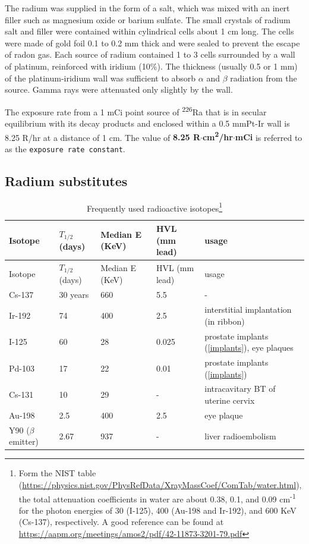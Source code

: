 \documentclass[]{book}
\let\rmarkdownfootnote\footnote%
\def\footnote{\protect\rmarkdownfootnote}
\theoremstyle{definition}
\theoremstyle{definition}
\theoremstyle{definition}
\theoremstyle{remark}
\begin{document}
The radium was supplied in the form of a salt, which was mixed with an
inert filler such as magnesium oxide or barium sulfate. The small
crystals of radium salt and filler were contained within cylindrical
cells about 1 cm long. The cells were made of gold foil 0.1 to 0.2 mm
thick and were sealed to prevent the escape of radon gas. Each source of
radium contained 1 to 3 cells surrounded by a wall of platinum,
reinforced with iridium (10\%). The thickness (usually 0.5 or 1 mm) of
the platinum-iridium wall was sufficient to absorb \(\alpha\) and
\(\beta\) radiation from the source. Gamma rays were attenuated only
slightly by the wall.

The exposure rate from a 1 mCi point source of \textsuperscript{226}Ra
that is in secular equilibrium with its decay products and enclosed
within a 0.5 mmPt-Ir wall is 8.25 R/hr at a distance of 1 cm. The value
of \textbf{8.25 R\(\cdot\)cm\textsuperscript{2}/hr\(\cdot\)mCi} is
referred to as the \texttt{exposure\ rate\ constant}.

\subsection{Radium substitutes}\label{radium-substitutes}

\begin{longtable}[]{@{}lllll@{}}
\caption{\label{tab:isotopes} Frequently used radioactive isotopes\footnote{Form
  the NIST table
  (\url{https://physics.nist.gov/PhysRefData/XrayMassCoef/ComTab/water.html}),
  the total attenuation coefficients in water are about 0.38, 0.1, and
  0.09 cm\textsuperscript{-1} for the photon energies of 30 (I-125), 400
  (Au-198 and Ir-192), and 600 KeV (Cs-137), respectively. A good
  reference can be found at
  \url{https://aapm.org/meetings/amos2/pdf/42-11873-3201-79.pdf}}}\tabularnewline
\toprule
Isotope & \(T_{1/2}\) (days) & Median E (KeV) & HVL (mm lead) &
usage\tabularnewline
\midrule
\endfirsthead
\toprule
Isotope & \(T_{1/2}\) (days) & Median E (KeV) & HVL (mm lead) &
usage\tabularnewline
\midrule
\endhead
Cs-137 & 30 years & 660 & 5.5 & -\tabularnewline
Ir-192 & 74 & 400 & 2.5 & interstitial implantation (in
ribbon)\tabularnewline
I-125 & 60 & 28 & 0.025 & prostate implants (\ref{implants}), eye
plaques\tabularnewline
Pd-103 & 17 & 22 & 0.01 & prostate implants
(\ref{implants})\tabularnewline
Cs-131 & 10 & 29 & - & intracavitary BT of uterine cervix\tabularnewline
Au-198 & 2.5 & 400 & 2.5 & eye plaque\tabularnewline
Y90 (\(\beta\) emitter) & 2.67 & 937 & - & liver
radioembolism\tabularnewline
\bottomrule
\end{longtable}
\end{document}
